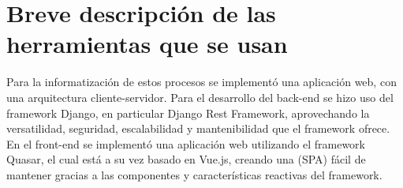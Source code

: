\section{Breve descripción de las herramientas que se usan}
Para la informatización de estos procesos se implementó
una aplicación web, con una arquitectura cliente-servidor.
Para el desarrollo del back-end se hizo uso del framework Django, en particular Django Rest Framework, aprovechando la
versatilidad, seguridad, escalabilidad y mantenibilidad
que el framework ofrece.
En el front-end se implementó una aplicación web utilizando el framework Quasar, el cual está a su vez basado en Vue.js, creando una (SPA) fácil de mantener
gracias a las componentes y características reactivas
del framework.

